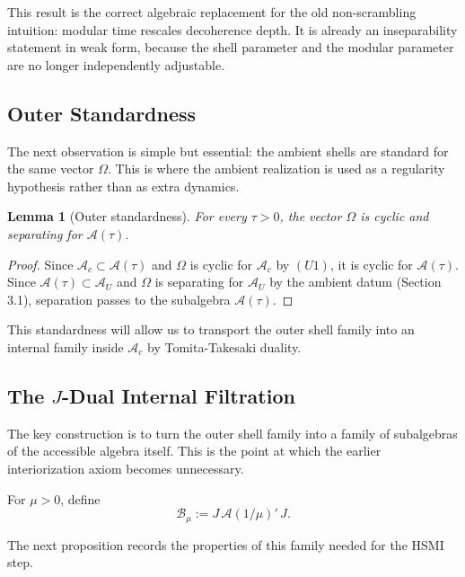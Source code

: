 \documentclass[12pt]{article}
\newtheorem{lemma}[theorem]{Lemma}
\theoremstyle{definition}
\theoremstyle{remark}
\begin{document}
This result is the correct algebraic replacement for the old
non-scrambling intuition: modular time rescales decoherence depth. It is
already an inseparability statement in weak form, because the shell
parameter and the modular parameter are no longer independently
adjustable.

\subsection{Outer Standardness}\label{outer-standardness}

The next observation is simple but essential: the ambient shells are
standard for the same vector \(\Omega\). This is where the ambient
realization is used as a regularity hypothesis rather than as extra
dynamics.

\begin{lemma}[Outer standardness]\label{lem:4.2}
For every \(\tau>0\), the vector \(\Omega\) is cyclic and separating for
\(\mathcal{A}(\tau)\).
\end{lemma}

\begin{proof}
Since \(\mathcal{A}_c\subset \mathcal{A}(\tau)\) and
\(\Omega\) is cyclic for \(\mathcal{A}_c\) by \((U1)\), it is cyclic for
\(\mathcal{A}(\tau)\). Since \(\mathcal{A}(\tau)\subset \mathcal{A}_U\)
and \(\Omega\) is separating for \(\mathcal{A}_U\) by the ambient datum
(Section 3.1), separation passes to the subalgebra
\(\mathcal{A}(\tau)\).
\end{proof}

This standardness will allow us to transport the outer shell family into
an internal family inside \(\mathcal{A}_c\) by Tomita-Takesaki duality.

\subsection{\texorpdfstring{The \(J\)-Dual Internal
Filtration}{The J-Dual Internal Filtration}}\label{the-j-dual-internal-filtration}

The key construction is to turn the outer shell family into a family of
subalgebras of the accessible algebra itself. This is the point at which
the earlier interiorization axiom becomes unnecessary.

For \(\mu>0\), define \[
\mathcal{B}_\mu:=J\,\mathcal{A}(1/\mu)'\,J.
\]

The next proposition records the properties of this family needed for
the HSMI step.
\end{document}
